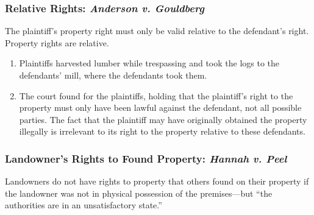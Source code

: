 \subsubsection{Relative Rights: \emph{Anderson v. Gouldberg}}

The plaintiff's property right must only be valid relative to the defendant's 
right. Property rights are relative.

\begin{enumerate}
    \item Plaintiffs harvested lumber while trespassing and took the logs to 
    the defendants' mill, where the defendants took them.
    \item The court found for the plaintiffs, holding that the plaintiff's 
    right to the property must only have been lawful against the defendant, 
    not all possible parties. The fact that the plaintiff may have originally 
    obtained the property illegally is irrelevant to its right to the property 
    relative to these defendants.
\end{enumerate}

\subsubsection{Landowner's Rights to Found Property: \emph{Hannah v. Peel}}

Landowners do not have rights to property that others found on their property 
if the landowner was not in physical possession of the premises---but ``the 
authorities are in an unsatisfactory state.''

